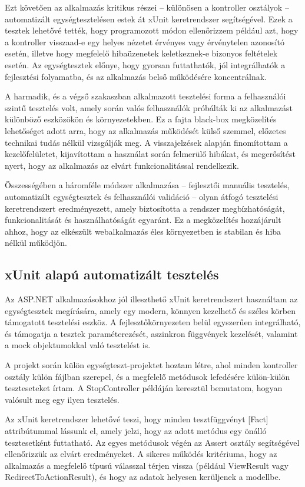 Ezt követően az alkalmazás kritikus részei – különösen a kontroller osztályok – automatizált egységtesztelésen estek át xUnit keretrendszer segítségével. Ezek a tesztek lehetővé tették, hogy programozott módon ellenőrizzem például azt, hogy a kontroller visszaad-e egy helyes nézetet érvényes vagy érvénytelen azonosító esetén, illetve hogy megfelelő hibaüzenetek keletkeznek-e bizonyos feltételek esetén. Az egységtesztek előnye, hogy gyorsan futtathatók, jól integrálhatók a fejlesztési folyamatba, és az alkalmazás belső működésére koncentrálnak.

A harmadik, és a végső szakaszban alkalmazott tesztelési forma a felhasználói szintű tesztelés volt, amely során valós felhasználók próbálták ki az alkalmazást különböző eszközökön és környezetekben. Ez a fajta black-box megközelítés lehetőséget adott arra, hogy az alkalmazás működését külső szemmel, előzetes technikai tudás nélkül vizsgálják meg. A visszajelzések alapján finomítottam a kezelőfelületet, kijavítottam a használat során felmerülő hibákat, és megerősítést nyert, hogy az alkalmazás az elvárt funkcionalitással rendelkezik.

Összességében a háromféle módszer alkalmazása – fejlesztői manuális tesztelés, automatizált egységtesztek és felhasználói validáció – olyan átfogó tesztelési keretrendszert eredményezett, amely biztosította a rendszer megbízhatóságát, funkcionalitását és használhatóságát egyaránt. Ez a megközelítés hozzájárult ahhoz, hogy az elkészült webalkalmazás éles környezetben is stabilan és hiba nélkül működjön.

\subsection{xUnit alapú automatizált tesztelés}

Az ASP.NET alkalmazásokhoz jól illeszthető xUnit keretrendszert használtam az egységtesztek megírására, amely egy modern, könnyen kezelhető és széles körben támogatott tesztelési eszköz. A fejlesztőkörnyezeten belül egyszerűen integrálható, és támogatja a tesztek paraméterezését, aszinkron függvények kezelését, valamint a mock objektumokkal való tesztelést is.

A projekt során külön egységteszt-projektet hoztam létre, ahol minden kontroller osztály külön fájlban szerepel, és a megfelelő metódusok lefedésére külön-külön teszteseteket írtam. A StopController példáján keresztül bemutatom, hogyan valósult meg egy ilyen tesztelés.

Az xUnit keretrendszer lehetővé teszi, hogy minden tesztfüggvényt [Fact] attribútummal lássunk el, amely jelzi, hogy az adott metódus egy önálló tesztesetként futtatható. Az egyes metódusok végén az Assert osztály segítségével ellenőrizzük az elvárt eredményeket. A sikeres működés kritériuma, hogy az alkalmazás a megfelelő típusú válasszal térjen vissza (például ViewResult vagy RedirectToActionResult), és hogy az adatok helyesen kerüljenek a modellbe.

